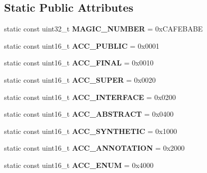 \subsection*{Static Public Attributes}
\begin{DoxyCompactItemize}
\item 
static const uint32\+\_\+t {\bfseries M\+A\+G\+I\+C\+\_\+\+N\+U\+M\+B\+ER} = 0x\+C\+A\+F\+E\+B\+A\+BE\hypertarget{classClassFile_a9a86c1e3bad5aa1fbe7f62b8c8894e83}{}\label{classClassFile_a9a86c1e3bad5aa1fbe7f62b8c8894e83}

\item 
static const uint16\+\_\+t {\bfseries A\+C\+C\+\_\+\+P\+U\+B\+L\+IC} = 0x0001\hypertarget{classClassFile_a136f640c12cd31d174fed27de55d9e67}{}\label{classClassFile_a136f640c12cd31d174fed27de55d9e67}

\item 
static const uint16\+\_\+t {\bfseries A\+C\+C\+\_\+\+F\+I\+N\+AL} = 0x0010\hypertarget{classClassFile_a284d6715a2914d845a878e7940dded2c}{}\label{classClassFile_a284d6715a2914d845a878e7940dded2c}

\item 
static const uint16\+\_\+t {\bfseries A\+C\+C\+\_\+\+S\+U\+P\+ER} = 0x0020\hypertarget{classClassFile_a8cecc64f1a1eba284639bf5ddcbda370}{}\label{classClassFile_a8cecc64f1a1eba284639bf5ddcbda370}

\item 
static const uint16\+\_\+t {\bfseries A\+C\+C\+\_\+\+I\+N\+T\+E\+R\+F\+A\+CE} = 0x0200\hypertarget{classClassFile_a58b40cee61b30f9226f826f88a7d3c2c}{}\label{classClassFile_a58b40cee61b30f9226f826f88a7d3c2c}

\item 
static const uint16\+\_\+t {\bfseries A\+C\+C\+\_\+\+A\+B\+S\+T\+R\+A\+CT} = 0x0400\hypertarget{classClassFile_a3a35282d757e38fccb2a4ae666455072}{}\label{classClassFile_a3a35282d757e38fccb2a4ae666455072}

\item 
static const uint16\+\_\+t {\bfseries A\+C\+C\+\_\+\+S\+Y\+N\+T\+H\+E\+T\+IC} = 0x1000\hypertarget{classClassFile_ab60ec9df262c29d110276482c72f557c}{}\label{classClassFile_ab60ec9df262c29d110276482c72f557c}

\item 
static const uint16\+\_\+t {\bfseries A\+C\+C\+\_\+\+A\+N\+N\+O\+T\+A\+T\+I\+ON} = 0x2000\hypertarget{classClassFile_ad37162e7b480660fab7ec2d33936f713}{}\label{classClassFile_ad37162e7b480660fab7ec2d33936f713}

\item 
static const uint16\+\_\+t {\bfseries A\+C\+C\+\_\+\+E\+N\+UM} = 0x4000\hypertarget{classClassFile_a1da2677a7301fea5c447dd8cdcb412b0}{}\label{classClassFile_a1da2677a7301fea5c447dd8cdcb412b0}

\end{DoxyCompactItemize}


